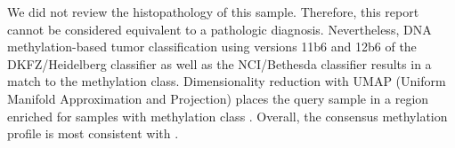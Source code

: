 We did not review the histopathology of this sample.
Therefore, this report cannot be considered equivalent to a pathologic diagnosis.
Nevertheless, DNA methylation-based tumor classification using versions 11b6 and 12b6 of the DKFZ/Heidelberg classifier as well as the NCI/Bethesda classifier results in a  match to the  methylation class.
Dimensionality reduction with UMAP (Uniform Manifold Approximation and Projection) places the query sample in a region enriched for samples with methylation class .
Overall, the consensus methylation profile is most consistent with .
